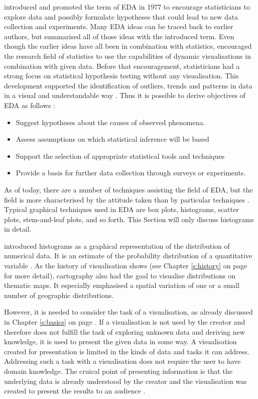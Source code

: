 \citeauthor{Tukey1977} introduced and promoted the term of \ac{EDA} in 1977 to encourage statisticians to explore data and possibly formulate hypotheses that could lead to new data collection and experiments. Many \ac{EDA} ideas can be traced back to earlier authors, but \citeauthor{Tukey1977} summarised all of those ideas with the introduced term. Even though the earlier ideas have all been in combination with statistics, \citeauthor{Tukey1977} encouraged the research field of statistics to use the capabilities of dynamic visualisations in combination with given data. Before that encouragement, statisticians had a strong focus on statistical hypothesis testing without any visualisation. This development supported the identification of outliers, trends and patterns in data in a visual and understandable way . Thus it is possible to derive objectives of \ac{EDA} as follows :

\begin{itemize}

\item Suggest hypotheses about the causes of observed phenomena.
\item Assess assumptions on which statistical inference will be based
\item Support the selection of appropriate statistical tools and techniques
\item Provide a basis for further data collection through surveys or experiments.

\end{itemize}

As of today, there are a number of techniques assisting the field of \ac{EDA}, but the field is more characterised by the attitude taken than by particular techniques . Typical graphical techniques used in \ac{EDA} are box plots, histograms, scatter plots, stem-and-leaf plots, and so forth. This Section will only discuss histograms in detail.

\citeauthor{Pearson1895} introduced histograms as a graphical representation of the distribution of numerical data. It is an estimate of the probability distribution of a quantitative variable . As the history of visualisation shows (see Chapter \ref{s:history} on page \pageref{s:history} for more detail), cartography also had the goal to visualise distributions on thematic maps. It especially emphasised a spatial variation of one or a small number of geographic distributions.

\cbstart
However, it is needed to consider the task of a visualisation, as already discussed in Chapter \ref{s:basics} on page \pageref{s:basics}. If a visualisation is not used by the creator and therefore does not fulfill the task of exploring unknown data and deriving new knowledge, it is used to present the given data in some way. A visualisation created for presentation is limited in the kinds of data and tasks it can address. Addressing such a task with a visualisation does not require the user to have domain knowledge. The cruical point of presenting information is that the underlying data is already understood by the creator and the visualisation was created to present the results to an audience .
\cbend

